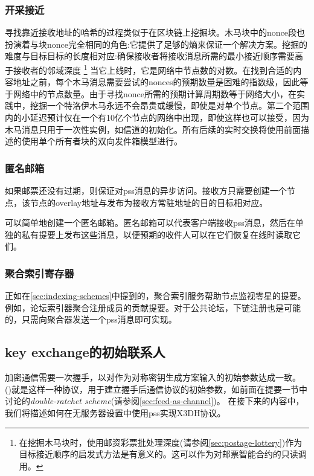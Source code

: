 \subsubsection{开采接近}

寻找靠近接收地址的哈希的过程类似于在区块链上挖掘块。木马块中的nonce段也扮演着与块nonce完全相同的角色:它提供了足够的熵来保证一个解决方案。挖掘的难度与目标目标的长度相对应:确保接收者将接收消息所需的最小接近顺序需要高于接收者的邻域深度%
%
\footnote{在挖掘木马块时，使用邮资彩票批处理深度(请参阅\ref{sec:postage-lottery})作为目标接近顺序的启发式方法是有意义的。这可以作为对邮票智能合约的只读调用。}
%
当它上线时，它是网络中节点数的对数。在找到合适的内容地址之前，每个木马消息需要尝试的nonces的预期数量是困难的指数级，因此等于网络中的节点数量。由于寻找nonce所需的预期计算周期数等于网络大小，在实践中，挖掘一个特洛伊木马永远不会昂贵或缓慢，即使是对单个节点。第二个范围内的小延迟预计仅在一个有10亿个节点的网络中出现，即使这样也可以接受，因为木马消息只用于一次性实例，如信道的初始化。所有后续的实时交换将使用前面描述的使用单个所有者块的双向发件箱模型进行。


\subsubsection{匿名邮箱}

如果邮票还没有过期，则保证对pss消息的异步访问。接收方只需要创建一个节点，该节点的overlay地址与发布为接收方常驻地址的目的目标相对应。

可以简单地创建一个匿名邮箱。匿名邮箱可以代表客户端接收pss消息，然后在单独的私有提要上发布这些消息，以便预期的收件人可以在它们恢复在线时读取它们。

\subsubsection{聚合索引寄存器}

正如在\ref{sec:indexing-schemes}中提到的，聚合索引服务帮助节点监视零星的提要。例如，论坛索引器聚合注册成员的贡献提要。对于公共论坛，下链注册也是可能的，只需向聚合器发送一个pss消息即可实现。 


\subsection{key exchange的初始联系人\statusgreen}\label{sec:pss-key-exchange}


加密通信需要一次握手，以对作为对称密钥生成方案输入的初始参数达成一致。 ()就是这样一种协议\cite{marlinspike2016x3dh}，用于建立握手后通信协议的初始参数，如前面在提要一节中讨论的\emph{double-ratchet scheme}(请参阅\ref{sec:feed-as-channel})。
在接下来的内容中，我们将描述如何在无服务器设置中使用pss实现X3DH协议。

